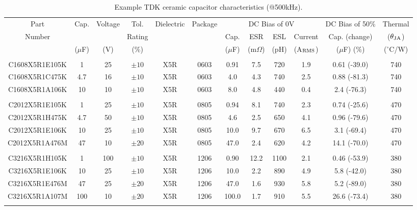 \documentclass[10pt,twoside]{article}
\begin{document}
\begin{landscape}
\begin{table}[p]
\small
\caption{Example TDK ceramic capacitor characteristics (@500kHz).}
\label{tab:tdk_caps}
\begin{center}
\begin{tabular}{|c|c|c|c|c|c||c|c|c|c||c||c|}
\hline
Part   & Cap. & Voltage & Tol. & Dielectric & Package &
\multicolumn{4}{c||}{DC Bias of 0V}  &
DC Bias of 50\% & Thermal\\
%
\cline{7-11}
Number &   &     & Rating     &            &         &
Cap. & ESR & ESL & Current    &
Cap. (change) & ($\theta_{\rm JA}$)\\
%
       & ($\mu$F) & (V) & (\%) & & & 
($\mu$F) & (m$\Omega$) & (pH) & (A$_{\rm RMS}$) &
($\mu$F) (\%) &($^\circ$C/W)\\
\hline\hline
&&&&&&&&&&&\\
C1608X5R1E105K &   1 &  25 & $\pm10$ & X5R & 0603 &  0.91 &  7.5 &  720 & 1.9 & 0.61 (-39.0) & 740 \\
C1608X5R1C475K & 4.7 &  16 & $\pm10$ & X5R & 0603 &   4.0 &  4.3 &  740 & 2.5 & 0.88 (-81.3) & 740 \\
C1608X5R1A106K &  10 &  10 & $\pm10$ & X5R & 0603 &   8.0 &  4.8 &  440 & 0.4 &  2.4 (-76.3) & 740 \\
&&&&&&&&&&&\\
C2012X5R1E105K &   1 &  25 & $\pm10$ & X5R & 0805 &  0.94 &  8.1 &  740 & 2.3 & 0.74 (-25.6) & 470 \\
C2012X5R1H475K & 4.7 &  50 & $\pm10$ & X5R & 0805 &   4.6 &  2.5 &  650 & 4.1 & 0.96 (-79.6) & 470 \\
C2012X5R1E106K &  10 &  25 & $\pm10$ & X5R & 0805 &  10.0 &  9.7 &  670 & 6.5 &  3.1 (-69.4) & 470 \\
C2012X5R1A476M &  47 &  10 & $\pm20$ & X5R & 0805 &  47.0 &  2.4 &  620 & 4.2 & 14.1 (-70.0) & 470 \\
&&&&&&&&&&&\\
C3216X5R1H105K &   1 & 100 & $\pm10$ & X5R & 1206 &  0.90 & 12.2 & 1100 & 2.1 & 0.46 (-53.9) & 380 \\
C3216X5R1E106K &  10 &  25 & $\pm10$ & X5R & 1206 &  10.0 &  2.2 &  890 & 4.9 &  5.8 (-42.0) & 380 \\
C3216X5R1E476M &  47 &  25 & $\pm20$ & X5R & 1206 &  47.0 &  1.6 &  930 & 5.8 &  5.2 (-89.0) & 380 \\
C3216X5R1A107M & 100 &  10 & $\pm20$ & X5R & 1206 & 100.0 &  1.7 &  910 & 5.5 & 26.6 (-73.4) & 380 \\
&&&&&&&&&&&\\

\end{tabular}
\end{center}
\end{table}
\end{landscape}
\end{document}
